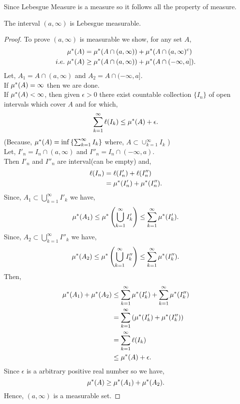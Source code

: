 Since Lebesgue Measure is a measure so it follows all the property of measure.

\begin{theorem}
    \label{open mesure}
    The interval $(a,\infty)$ is Lebesgue measurable.
\end{theorem}
\begin{proof}
    To prove $(a,\infty)$ is measurable we show, for any set $A$,
    \begin{align*}
        \mu^{*}(A)&=\mu^{*}(A\cap(a,\infty))+\mu^{*}(A\cap(a,\infty)^{c})\\
        i.e.\ \mu^{*}(A)&\ge \mu^{*}(A\cap(a,\infty))+\mu^{*}(A\cap(-\infty,a]).
    \end{align*}
    Let, $A_1=A\cap(a,\infty)$ and $A_2=A\cap(-\infty,a]$.\\
    If $\mu^{*}(A)=\infty$ then we are done.\\
    If $\mu^{*}(A)<\infty$, then given $\epsilon>0$ there exist countable collection  $\{I_n\}$ of open intervals which cover  $A$ and for which,
    \[
        \sum_{k=1}^{\infty}\ell(I_k)\le \mu^{*}(A)+\epsilon.
    \]
    (Because, $\mu^{*}(A)=\inf\left\{ \sum_{k=1}^{\infty}I_k \right\}$ where, $A\subset\cup_{k=1}^{\infty}I_k$ )\\
    Let, $I'_n=I_n\cap(a,\infty)$ and $I''_n=I_n\cap(-\infty,a)$.\\
    Then $I'_n$ and  $I''_n$ are interval(can be empty) and,
    \begin{align*}
        \ell(I_n)&=\ell(I'_n)+\ell(I''_n)\\
                 &=\mu^{*}(I'_n)+\mu^{*}(I''_n).
    \end{align*}
    Since, $A_1\subset\bigcup_{k=1}^{\infty}I'_k$ we have,
    \[
        \mu^{*}(A_1)\le \mu^{*}\left( \bigcup_{k=1}^{\infty}I'_k \right) \le \sum_{k=1}^{\infty}\mu^{*}(I'_k).
    \]
    Since, $A_2\subset\bigcup_{k=1}^{\infty}I''_k$ we have,
    \[
        \mu^{*}(A_2)\le \mu^{*}\left( \bigcup_{k=1}^{\infty}I''_k \right) \le \sum_{k=1}^{\infty}\mu^{*}(I''_k).
    \]
    Then,
    \begin{align*}
        \mu^{*}(A_1)+\mu^{*}(A_2)&\le \sum_{k=1}^{\infty}\mu^{*}(I'_k)+\sum_{k=1}^{\infty}\mu^{*}(I''_k)\\
                           &=\sum_{k=1}^{\infty}\left( \mu^{*}(I'_k)+\mu^{*}(I''_k) \right)\\
                           &=\sum_{k=1}^{\infty}\ell(I_k)\\
                           &\le \mu^{*}(A)+\epsilon.
    \end{align*}
    Since $\epsilon$ is a arbitrary positive real number so we have,
    \[
        \mu^{*}(A)\ge \mu^{*}(A_1)+\mu^{*}(A_2).
    \]
    Hence, $(a,\infty)$ is a measurable set.
\end{proof}

